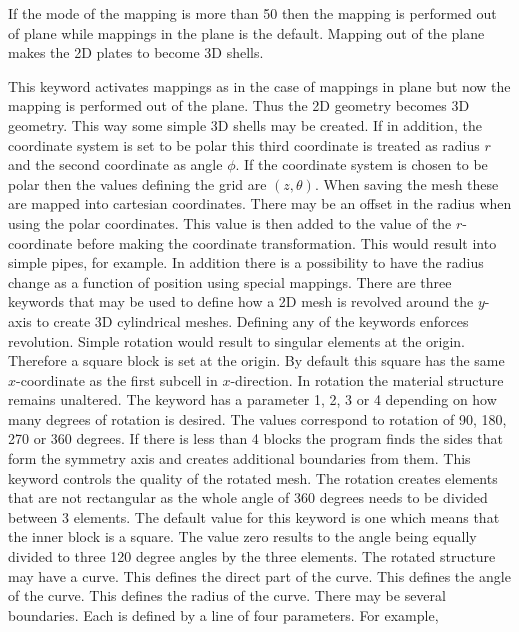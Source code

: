 If the mode of the mapping is more than 50 then 
the mapping is performed out of plane while mappings 
in the plane is the default.
Mapping out of the plane makes the 2D plates to become 3D shells.

This keyword activates mappings as in the case of mappings in plane 
but now the mapping is performed 
out of the plane. 
Thus the 2D geometry becomes 3D geometry.
This way some simple 3D shells may be created. 
If in addition, the coordinate system is set to be polar this 
third coordinate is treated as radius $r$ and the second
coordinate as angle $\phi$. 
%
If the coordinate system is chosen to be polar then 
the values defining the grid are $(z,\theta)$.
When saving the mesh these are mapped into cartesian coordinates.
There may be an offset in the radius when using the polar coordinates.
This value is then added to the value of the $r$-coordinate before making the
coordinate transformation. This would result into simple pipes, for example.
In addition there is a possibility to have the radius change as a function
of position using special mappings.
%
There are three keywords that may be used to define how a 2D mesh is revolved
around the $y$-axis
to create 3D cylindrical meshes.
Defining any of the keywords enforces revolution.
Simple rotation would result to singular elements at the 
origin. Therefore a square block is set at the origin.
By default this square has the same $x$-coordinate as the
first subcell in $x$-direction.
In rotation the material structure remains unaltered. 
%
The keyword has a parameter 1, 2, 3 or 4 depending on 
how many degrees of rotation is desired. The values 
correspond to rotation of 90, 180, 270 or 360 degrees.
If there is less than 4
blocks the program finds the sides that form the 
symmetry axis and creates additional boundaries from them.   
%
This keyword controls the quality of the rotated mesh.
The rotation creates elements that are not rectangular as
the whole angle of 360 degrees needs to be divided between 3
elements. The default value for this keyword is one 
which means that the inner block is a square.
The value zero results to the angle being equally divided to three 
120 degree angles by the three elements.
%
The rotated structure may have a curve. This defines the 
direct part of the curve.
This defines the angle of the curve.
This defines the radius of the curve.
%
There may be several boundaries. Each is defined by a line
of four parameters.  For example,

